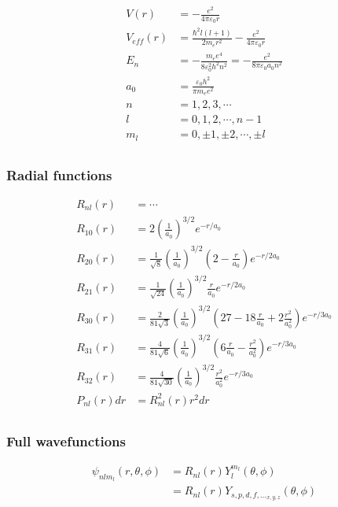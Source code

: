 \begin{align*}
V\left(r\right)&=-\frac{e^2}{4\pi\varepsilon_0 r}\\
V_{eff}\left(r\right)&=\frac{\hbar^2 l\left(l+1\right)}{2m_er^2}-\frac{e^2}{4\pi\varepsilon_0 r}\\
E_n&=-\frac{m_ee^4}{8\varepsilon_0^2h^2n^2}=-\frac{e^2}{8\pi\varepsilon_0a_0n^2}\\
a_0&=\frac{\varepsilon_0h^2}{\pi m_ee^2}\\
n &= 1, 2, 3, \cdots\\
l&=0, 1, 2, \cdots, n-1\\
m_l&= 0, \pm1, \pm2, \cdots, \pm l\\
\end{align*}

\subsubsection{Radial functions}
\begin{align*}
R_{nl}\left(r\right)&=\cdots\\
R_{10}\left(r\right)&=2\left( \frac{1}{a_0} \right)^{3/2}e^{-r/a_0}\\
R_{20}\left(r\right)&=\frac{1}{\sqrt{8}}  \left( \frac{1}{a_0} \right)^{3/2} \left( 2-\frac{r}{a_0} \right) e^{-r/2a_0}\\
R_{21}\left(r\right)&=\frac{1}{\sqrt{24}}  \left( \frac{1}{a_0} \right)^{3/2} \frac{r}{a_0} e^{-r/2a_0}\\
R_{30}\left(r\right)&=\frac{2}{81\sqrt{3}}  \left( \frac{1}{a_0} \right)^{3/2} \left( 27-18\frac{r}{a_0} +2\frac{r^2}{a_0^2}\right) e^{-r/3a_0}\\
R_{31}\left(r\right)&=\frac{4}{81\sqrt{6}}  \left( \frac{1}{a_0} \right)^{3/2} \left( 6\frac{r}{a_0} -\frac{r^2}{a_0^2}\right) e^{-r/3a_0}\\
R_{32}\left(r\right)&=\frac{4}{81\sqrt{30}}  \left( \frac{1}{a_0} \right)^{3/2} \frac{r^2}{a_0^2} e^{-r/3a_0}\\
P_{nl}\left(r\right)dr&=R^2_{nl}\left(r\right) r^2dr\\
\end{align*}
\subsubsection{Full wavefunctions}
\begin{align*}
\psi_{nlm_l}\left(r,\theta,\phi \right)&=R_{nl}\left(r\right)Y_l^{m_l}\left(\theta,\phi\right)\\
&=R_{nl}\left(r\right)Y_{s,p,d,f,\ldots_{x,y,z}}\left(\theta,\phi\right)\\
\end{align*}
